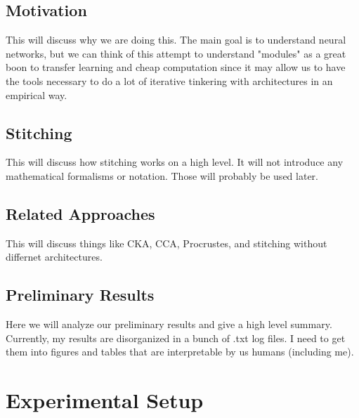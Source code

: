 \documentclass{article} %
\begin{document}
\subsection{Motivation}
This will discuss why we are doing this. The main goal is to understand neural networks, but we can think of this
attempt to understand "modules" as a great boon to transfer learning and cheap computation since it may allow us to
have the tools necessary to do a lot of iterative tinkering with architectures in an empirical way.

\subsection{Stitching}
This will discuss how stitching works on a high level. It will not introduce any mathematical formalisms or notation.
Those will probably be used later.

\subsection{Related Approaches}
This will discuss things like CKA, CCA, Procrustes, and stitching without differnet architectures.

\subsection{Preliminary Results}
Here we will analyze our preliminary results and give a high level summary. Currently, my results are disorganized in a bunch
of .txt log files. I need to get them into figures and tables that are interpretable by us humans (including me).

% 
% 
\section{Experimental Setup}
\end{document}
